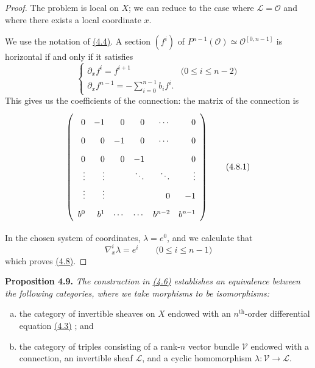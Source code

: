 \documentclass{report}
\newenvironment{itenv}[1]
  {\phantomsection\par\medskip\noindent\textbf{#1.}\itshape}
  {\medskip}
\newcommand{\scr}[1]{{\mathscr{#1}}}
\renewcommand{\cal}[1]{{\mathcal{#1}}}
\renewcommand{\leq}{\leqslant}
\newcommand{\oldpage}[1]{\marginpar{\footnotesize$\Big\vert$ \textit{p.~#1}}}
\begin{document}
\begin{proof}
  The problem is local on $X$;
  we can reduce to the case where $\scr{L}=\cal{O}$ and where there exists a local coordinate $x$.

  We use the notation of \hyperref[I.4.4]{(4.4)}.
  A section $(f^i)$ of $P^{n-1}(\cal{O})\simeq\cal{O}^{[0,n-1]}$ is horizontal if and only if it satisfies
  \[
    \begin{cases}
      \partial_x f^i = f^{i+1}
      & \mbox{($0\leq i\leq n-2$)}
    \\\partial_x f^{n-1} = -\sum_{i=0}^{n-1} b_i f^i.
    \end{cases}
  \]
  This gives us the coefficients of the connection: the matrix of the connection is
  \[
  \label{I.4.8.1}
    \left(
      \def\arraystretch{1.8}
      \begin{array}{rrrrrr}
        0 & -1 & 0 & 0 & \cdots & 0
      \\0 & 0 & -1 & 0 & \cdots & 0
      \\0 & 0 & 0 & -1 & & 0
      \\\vdots & \vdots & & \ddots & \ddots & \vdots
      \\\vdots & \vdots & & & 0 & -1
      \\b^0 & b^1 & \cdots & \cdots & b^{n-2} & b^{n-1}
      \end{array}
    \right)
  \tag{4.8.1}
  \]

\oldpage{27}
  In the chosen system of coordinates, $\lambda=e^0$, and we calculate that
  \[
    \nabla_x^i\lambda = e^i
    \qquad\mbox{($0\leq i\leq n-1$)}
  \]
  which proves \hyperref[I.4.8]{(4.8)}.
\end{proof}

\begin{itenv}{Proposition 4.9}
\label{I.4.9}
  The construction in \hyperref[I.4.6]{(4.6)} establishes an equivalence between the following categories, where we take morphisms to be isomorphisms:
  \begin{enumerate}[a)]
    \item the category of invertible sheaves on $X$ endowed with an $n^\mathrm{th}$-order differential equation \hyperref[I.4.3]{(4.3)} ; and
    \item the category of triples consisting of a rank-$n$ vector bundle $\scr{V}$ endowed with a connection, an invertible sheaf $\scr{L}$, and a cyclic homomorphism $\lambda\colon\scr{V}\to\scr{L}$.
  \end{enumerate}
\end{itenv}
\end{document}
